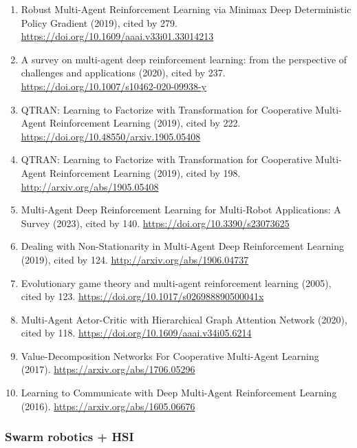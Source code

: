 \documentclass[
]{article}
\begin{document}
\begin{enumerate}
  cited by 289. \url{http://arxiv.org/abs/1810.02912}
\item
  Robust Multi-Agent Reinforcement Learning via Minimax Deep
  Deterministic Policy Gradient (2019), cited by 279.
  \url{https://doi.org/10.1609/aaai.v33i01.33014213}
\item
  A survey on multi-agent deep reinforcement learning: from the
  perspective of challenges and applications (2020), cited by 237.
  \url{https://doi.org/10.1007/s10462-020-09938-y}
\item
  QTRAN: Learning to Factorize with Transformation for Cooperative
  Multi-Agent Reinforcement Learning (2019), cited by 222.
  \url{https://doi.org/10.48550/arxiv.1905.05408}
\item
  QTRAN: Learning to Factorize with Transformation for Cooperative
  Multi-Agent Reinforcement Learning (2019), cited by 198.
  \url{http://arxiv.org/abs/1905.05408}
\item
  Multi-Agent Deep Reinforcement Learning for Multi-Robot Applications:
  A Survey (2023), cited by 140. \url{https://doi.org/10.3390/s23073625}
\item
  Dealing with Non-Stationarity in Multi-Agent Deep Reinforcement
  Learning (2019), cited by 124. \url{http://arxiv.org/abs/1906.04737}
\item
  Evolutionary game theory and multi-agent reinforcement learning
  (2005), cited by 123. \url{https://doi.org/10.1017/s026988890500041x}
\item
  Multi-Agent Actor-Critic with Hierarchical Graph Attention Network
  (2020), cited by 118. \url{https://doi.org/10.1609/aaai.v34i05.6214}
\item
  Value-Decomposition Networks For Cooperative Multi-Agent Learning
  (2017). \url{https://arxiv.org/abs/1706.05296}
\item
  Learning to Communicate with Deep Multi-Agent Reinforcement Learning
  (2016). \url{https://arxiv.org/abs/1605.06676}
\end{enumerate}

\hypertarget{swarm-robotics-hsi}{%
\subsubsection{Swarm robotics + HSI}\label{swarm-robotics-hsi}}
\end{document}
